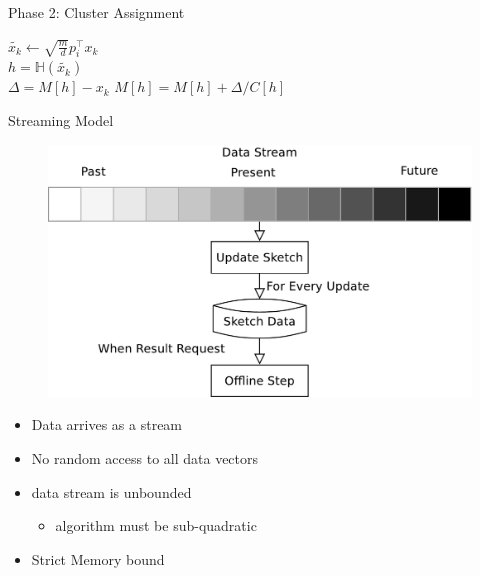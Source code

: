 \documentclass[12pt]{beamer}
\begin{document}
\begin{frame}[plain]{Phase 2: Cluster Assignment}

{
  {
    $\tilde{x_k}\leftarrow \sqrt{\frac{m}{d}}p_i^{\intercal}x_k $\\%
    $h =  \mathbb{H}(\tilde{x_k})$\\%
    {
	$\Delta = M[h]-x_k$%
	$M[h]=M[h]+\Delta/C[h]$  %
    }
  }
}
\end{frame}

\begin{frame}[plain]{Streaming Model}
\begin{figure}
 \centerline{\includegraphics[width=.65\textwidth]{figs/Streaming}}
\end{figure}
\vspace*{2\bigskipamount}
\begin{itemize}
 \item Data arrives as a stream
 \item No random access to all data vectors 
 \item data stream is unbounded
 \begin{itemize}
 \item algorithm must be sub-quadratic
 \end{itemize}
 \item Strict Memory bound
\end{itemize}
\end{frame}
\end{document}
